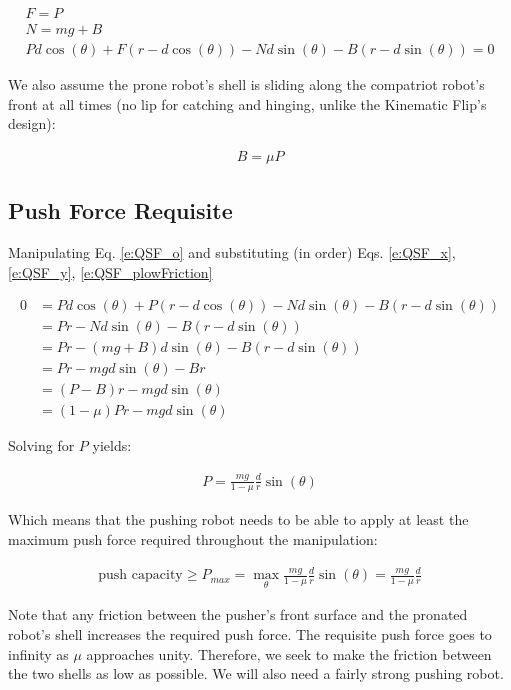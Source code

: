 \documentclass[letterpaper]{report}
\begin{document}
\begin{align}
  F = P \label{e:QSF_x} \\
  N = mg + B \label{e:QSF_y} \\
  P d \cos(\theta) + F(r - d \cos(\theta)) - N d \sin(\theta) - B (r - d \sin(\theta)) = 0 \label{e:QSF_o}
\end{align}

We also assume the prone robot's shell is sliding along the compatriot robot's front at all times (no lip for catching and hinging, unlike the Kinematic Flip's design):

\begin{align}
  B = \mu P \label{e:QSF_plowFriction}
\end{align}

\subsection{Push Force Requisite}
Manipulating Eq. \ref{e:QSF_o} and substituting (in order) Eqs. \ref{e:QSF_x}, \ref{e:QSF_y}, \ref{e:QSF_plowFriction}

\begin{align}
  0 &= P d \cos(\theta) + P(r - d \cos(\theta)) - N d \sin(\theta) - B (r - d \sin(\theta))
  \\&= Pr - N d \sin(\theta) - B (r - d \sin(\theta))
  \\&= Pr - (mg + B) d \sin(\theta) - B (r - d \sin(\theta))
  \\&= Pr - mg d \sin(\theta) - B r
  \\&= (P - B)r - mg d \sin(\theta)
  \\&= (1-\mu) P r - mg d \sin(\theta)
\end{align}

Solving for $P$ yields:

\begin{align}
  P = \frac{mg}{1-\mu} \frac{d}{r} \sin(\theta)
\end{align}

Which means that the pushing robot needs to be able to apply at least the maximum push force required throughout the manipulation:

\begin{align}
  \text{push capacity} \geq P_{max} = \max_\theta \frac{mg}{1-\mu} \frac{d}{r} \sin(\theta) = \frac{mg}{1-\mu} \frac{d}{r}
\end{align}

Note that any friction between the pusher's front surface and the pronated robot's shell increases the required push force.
The requisite push force goes to infinity as $\mu$ approaches unity.
Therefore, we seek to make the friction between the two shells as low as possible.
We will also need a fairly strong pushing robot.
\end{document}
